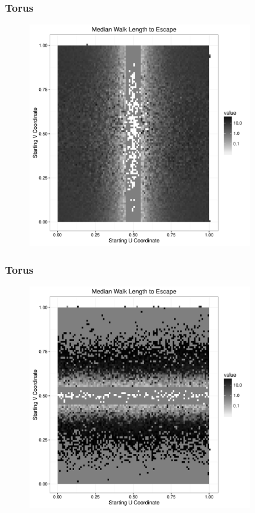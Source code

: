 \documentclass{beamer}
\begin{document}

\begin{frame}
	
	\frametitle{Torus}
	
	\begin{figure}
		\includegraphics[width=0.85\textwidth]{images/TorusUBand.pdf}
	\end{figure}
	
\end{frame}

\begin{frame}
	
	\frametitle{Torus}
	
	\begin{figure}
		\includegraphics[width=0.85\textwidth]{images/TorusVBand.pdf}
	\end{figure}
	
\end{frame}
\end{document}
